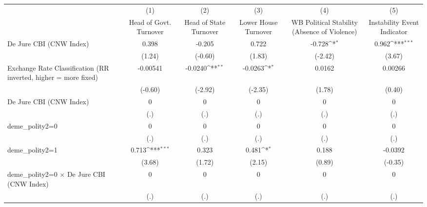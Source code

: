 {
\def\sym#1{\ifmmode^{#1}\else\(^{#1}\)\fi}
\begin{tabular*}{\linewidth}{@{\hskip\tabcolsep\extracolsep\fill}l*{5}{c}}
\toprule
                &\multicolumn{1}{c}{(1)}&\multicolumn{1}{c}{(2)}&\multicolumn{1}{c}{(3)}&\multicolumn{1}{c}{(4)}&\multicolumn{1}{c}{(5)}\\
                &\multicolumn{1}{c}{Head of Govt. Turnover}&\multicolumn{1}{c}{Head of State Turnover}&\multicolumn{1}{c}{Lower House Turnover}&\multicolumn{1}{c}{WB Political Stability (Absence of Violence)}&\multicolumn{1}{c}{Instability Event Indicator}\\
\midrule
De Jure CBI (CNW Index)&    0.398         &   -0.205         &    0.722         &   -0.728\sym{*}  &    0.962\sym{***}\\
                &   (1.24)         &  (-0.60)         &   (1.83)         &  (-2.42)         &   (3.67)         \\
\addlinespace
Exchange Rate Classification (RR inverted, higher = more fixed)& -0.00541         &  -0.0240\sym{**} &  -0.0263\sym{*}  &   0.0162         &  0.00266         \\
                &  (-0.60)         &  (-2.92)         &  (-2.35)         &   (1.78)         &   (0.40)         \\
\addlinespace
De Jure CBI (CNW Index)&        0         &        0         &        0         &        0         &        0         \\
                &      (.)         &      (.)         &      (.)         &      (.)         &      (.)         \\
\addlinespace
deme\_polity2=0  &        0         &        0         &        0         &        0         &        0         \\
                &      (.)         &      (.)         &      (.)         &      (.)         &      (.)         \\
\addlinespace
deme\_polity2=1  &    0.713\sym{***}&    0.323         &    0.481\sym{*}  &    0.188         &  -0.0392         \\
                &   (3.68)         &   (1.72)         &   (2.15)         &   (0.89)         &  (-0.35)         \\
\addlinespace
deme\_polity2=0 $\times$ De Jure CBI (CNW Index)&        0         &        0         &        0         &        0         &        0         \\
                &      (.)         &      (.)         &      (.)         &      (.)         &      (.)         \\

\end{tabular*}}
